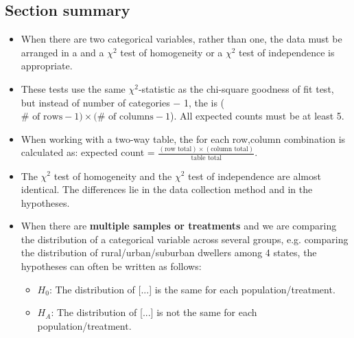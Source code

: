 \subsection*{Section summary}
\begin{itemize}

\item When there are two categorical variables, rather than one, the data must be arranged in a  and a $\chi^2$ test of homogeneity or a $\chi^2$ test of independence is appropriate.  
\item These tests use the same $\chi^2$-statistic as the chi-square goodness of fit test, but instead of number of categories $-$ 1, the  is ($\# \text{ of rows} - 1)\times (\# \text{ of columns} -1$).  All expected counts must be at least 5.

\item When working with a two-way table, the  for each row,column combination is calculated as: expected count = $\frac{(\text{row total})\times (\text{column total})}{\text{table total}}$.  

\item The $\chi^2$ test of homogeneity and the $\chi^2$ test of independence are almost identical.  The differences lie in the data collection method and in the hypotheses.

\item When there are \textbf{multiple samples or treatments} and we are comparing the distribution of a categorical variable across several groups, e.g. comparing the distribution of rural/urban/suburban dwellers among 4 states, the hypotheses can often be written as follows:  
 \begin{itemize}
\item[] $H_0$:  The distribution of [...] is the same for each population/treatment.  
\item[] $H_A$:  The distribution of [...] is not the same for each population/treatment.


\end{itemize}
\end{itemize}
